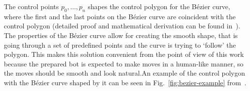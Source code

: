 The control points $p_0,\dots,p_n$ shapes the control polygon for the Bézier curve, where the first and the last points on the Bézier curve are coincident with the control polygon (detailed proof and mathematical derivation can be found in~\cite{farouki2012bernstein}).
The properties of the Bézier curve allow for creating the smooth shape, that is going through a set of predefined points and the curve is trying to `follow' the polygon.
This makes this solution convenient from the point of view of this work because the prepared bot is expected to make moves in a human-like manner, so the moves should be smooth and look natural.An example of the control polygon with the Bézier curve shaped by it can be seen in Fig.~\ref{fig:bezier-example} from~\cite{farouki2012bernstein}.
